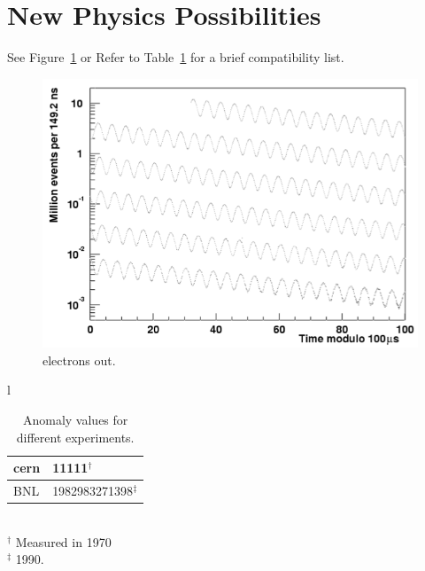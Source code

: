 \section{New Physics Possibilities}

See Figure~\ref{fig:osc} or Refer to Table~\ref{tab:exp} for a brief compatibility list.

\begin{figure}
  \centering
  \includegraphics[scale=0.5]{figures/oscillation}
  \caption{electrons out.}
  \label{fig:osc}
\end{figure}


\begin{table}
  \caption{Anomaly values for different experiments.}
  \label{tab:exp}
  \centering
  \begin{tabular}{l}
    \begin{tabular*}{0.6\textwidth}{l @{\extracolsep{\fill}} l} \hline \hline
      cern  & 11111$^{\dagger}$ \\ \hline
          BNL         & 1982983271398$^{\ddagger}$ \\
           \hline
    \end{tabular*} \\
    $^{\dagger}$ Measured in 1970\\
    $^{\ddagger}$ 1990. \\
  \end{tabular}
\end{table}